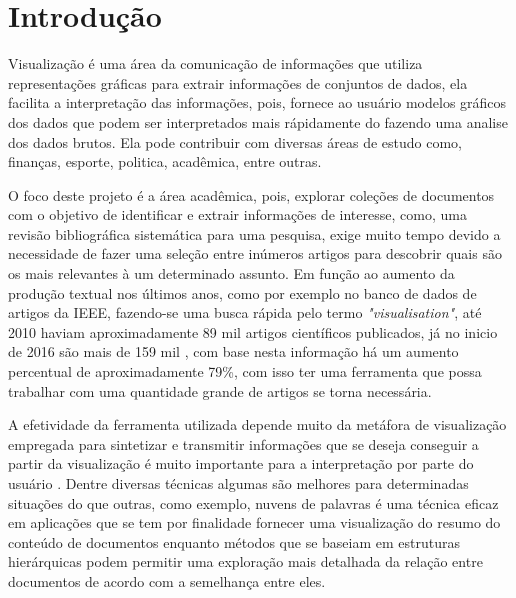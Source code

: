 \pagestyle{plain} 


\newcommand{\R}[1]{\ensuremath{\mathbb{R}^{#1}}}
\newcommand{\DB}{\ensuremath{\mathcal{D}}}

\chapter{Introdução}
\label{cap-introducao}

Visualização é uma área da comunicação de informações que utiliza representações gráficas para extrair informações de conjuntos de dados\cite{ward2010interactive}, ela facilita a interpretação das informações, pois, fornece ao usuário modelos gráficos dos dados que podem ser interpretados mais rápidamente do fazendo uma analise dos dados brutos. Ela pode contribuir com diversas áreas de estudo como, finanças, esporte, politica, acadêmica, entre outras.

O foco deste projeto é a área acadêmica, pois, explorar coleções de documentos com o objetivo de identificar e extrair informações de interesse, como, uma revisão bibliográfica sistemática para uma pesquisa, exige muito tempo devido a necessidade de fazer uma seleção entre inúmeros artigos para descobrir quais são os mais relevantes à um determinado assunto. Em função ao aumento da produção textual nos últimos anos, como por exemplo no banco de dados de artigos da IEEE, fazendo-se uma busca rápida pelo termo \emph{"visualisation"}, até 2010 haviam aproximadamente 89 mil artigos científicos publicados, já no inicio de 2016 são mais de 159 mil \cite{IEEEsearch}, com base nesta informação há um aumento percentual de aproximadamente 79\%, com isso ter uma ferramenta que possa trabalhar com uma quantidade grande de artigos se torna necessária.

A efetividade da ferramenta utilizada depende muito da metáfora de visualização empregada para sintetizar e transmitir informações que se deseja conseguir a partir da visualização é muito importante para a interpretação por parte do usuário \cite{pagliosa2013mist}. Dentre diversas técnicas algumas são melhores para determinadas situações do que outras, como exemplo, nuvens de palavras é uma técnica eficaz em aplicações que se tem por finalidade fornecer uma visualização do resumo do conteúdo de documentos enquanto métodos que se baseiam em estruturas hierárquicas podem permitir uma exploração mais detalhada da relação entre documentos de acordo com a semelhança entre eles.

